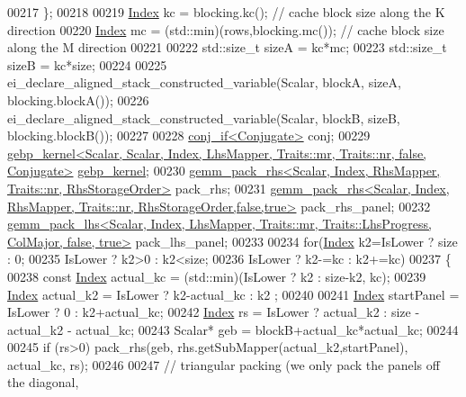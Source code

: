 \begin{DoxyCode}
00217     \};
00218 
00219     \hyperlink{namespace_eigen_a62e77e0933482dafde8fe197d9a2cfde}{Index} kc = blocking.kc();                   \textcolor{comment}{// cache block size along the K direction}
00220     \hyperlink{namespace_eigen_a62e77e0933482dafde8fe197d9a2cfde}{Index} mc = (std::min)(rows,blocking.mc());  \textcolor{comment}{// cache block size along the M direction}
00221 
00222     std::size\_t sizeA = kc*mc;
00223     std::size\_t sizeB = kc*size;
00224 
00225     ei\_declare\_aligned\_stack\_constructed\_variable(Scalar, blockA, sizeA, blocking.blockA());
00226     ei\_declare\_aligned\_stack\_constructed\_variable(Scalar, blockB, sizeB, blocking.blockB());
00227 
00228     \hyperlink{struct_eigen_1_1internal_1_1conj__if}{conj\_if<Conjugate>} conj;
00229     
      \hyperlink{struct_eigen_1_1internal_1_1gebp__kernel}{gebp\_kernel<Scalar, Scalar, Index, LhsMapper, Traits::mr, Traits::nr, false, Conjugate>}
       \hyperlink{struct_eigen_1_1internal_1_1gebp__kernel}{gebp\_kernel};
00230     \hyperlink{struct_eigen_1_1internal_1_1gemm__pack__rhs}{gemm\_pack\_rhs<Scalar, Index, RhsMapper, Traits::nr, RhsStorageOrder>}
       pack\_rhs;
00231     
      \hyperlink{struct_eigen_1_1internal_1_1gemm__pack__rhs}{gemm\_pack\_rhs<Scalar, Index, RhsMapper, Traits::nr, RhsStorageOrder,false,true>}
       pack\_rhs\_panel;
00232     
      \hyperlink{struct_eigen_1_1internal_1_1gemm__pack__lhs}{gemm\_pack\_lhs<Scalar, Index, LhsMapper, Traits::mr, Traits::LhsProgress, ColMajor, false, true>}
       pack\_lhs\_panel;
00233 
00234     \textcolor{keywordflow}{for}(\hyperlink{namespace_eigen_a62e77e0933482dafde8fe197d9a2cfde}{Index} k2=IsLower ? size : 0;
00235         IsLower ? k2>0 : k2<size;
00236         IsLower ? k2-=kc : k2+=kc)
00237     \{
00238       \textcolor{keyword}{const} \hyperlink{namespace_eigen_a62e77e0933482dafde8fe197d9a2cfde}{Index} actual\_kc = (std::min)(IsLower ? k2 : size-k2, kc);
00239       \hyperlink{namespace_eigen_a62e77e0933482dafde8fe197d9a2cfde}{Index} actual\_k2 = IsLower ? k2-actual\_kc : k2 ;
00240 
00241       \hyperlink{namespace_eigen_a62e77e0933482dafde8fe197d9a2cfde}{Index} startPanel = IsLower ? 0 : k2+actual\_kc;
00242       \hyperlink{namespace_eigen_a62e77e0933482dafde8fe197d9a2cfde}{Index} rs = IsLower ? actual\_k2 : size - actual\_k2 - actual\_kc;
00243       Scalar* geb = blockB+actual\_kc*actual\_kc;
00244 
00245       \textcolor{keywordflow}{if} (rs>0) pack\_rhs(geb, rhs.getSubMapper(actual\_k2,startPanel), actual\_kc, rs);
00246 
00247       \textcolor{comment}{// triangular packing (we only pack the panels off the diagonal,}

\end{DoxyCode}
